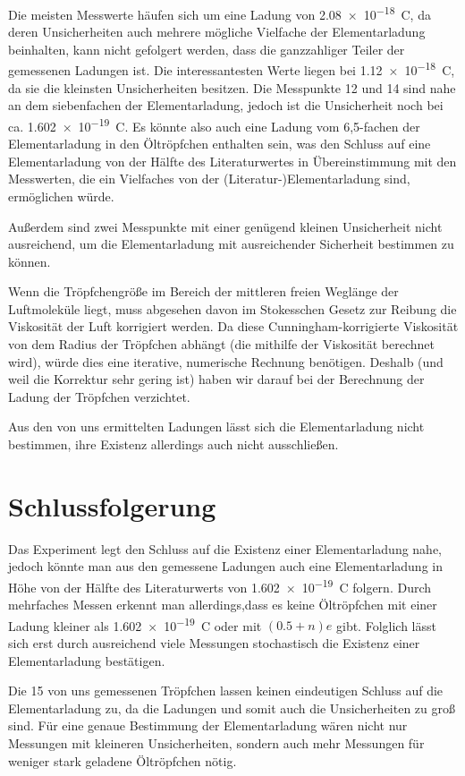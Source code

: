 \documentclass[
	a4paper,
	12pt,
	pagesize,
	ngerman
]{scrartcl}
\begin{document}
	Die meisten Messwerte häufen sich um  eine Ladung von \SI{2,08e-18}{C}, da deren Unsicherheiten auch mehrere mögliche Vielfache der Elementarladung beinhalten, kann nicht gefolgert werden, dass die ganzzahliger Teiler der gemessenen Ladungen ist.
	Die interessantesten Werte liegen bei \SI{1,12e-18}{C}, da sie die kleinsten Unsicherheiten besitzen.
	Die Messpunkte 12 und 14 sind nahe an dem siebenfachen der Elementarladung, jedoch ist die Unsicherheit noch bei ca. \SI{1,602e-19}{C}.
	Es könnte also auch eine Ladung vom 6,5-fachen der Elementarladung in den Öltröpfchen enthalten sein, was den Schluss auf eine Elementarladung von der Hälfte des Literaturwertes in Übereinstimmung mit den Messwerten, die ein Vielfaches von der (Literatur-)Elementarladung sind, ermöglichen würde.
	
	Außerdem sind zwei Messpunkte mit einer genügend kleinen Unsicherheit nicht ausreichend, um die Elementarladung mit ausreichender Sicherheit bestimmen zu können.
	
	Wenn die Tröpfchengröße im Bereich der mittleren freien Weglänge der Luftmoleküle liegt, muss abgesehen davon im Stokesschen Gesetz zur Reibung die Viskosität der Luft korrigiert werden.
	Da diese Cunningham-korrigierte Viskosität von dem Radius der Tröpfchen abhängt (die mithilfe der Viskosität berechnet wird), würde dies eine iterative, numerische Rechnung benötigen.
	Deshalb (und weil die Korrektur sehr gering ist) haben wir darauf bei der Berechnung der Ladung der Tröpfchen verzichtet.

	Aus den von uns ermittelten Ladungen lässt sich die Elementarladung nicht bestimmen, ihre Existenz allerdings auch nicht ausschließen.

	
	\section{Schlussfolgerung}
	Das Experiment legt den Schluss auf die Existenz einer Elementarladung nahe, jedoch könnte man aus den gemessene Ladungen auch eine Elementarladung in Höhe von der Hälfte des Literaturwerts von \SI{1,602e-19}{C} folgern.
	Durch mehrfaches Messen erkennt man allerdings,dass es keine Öltröpfchen mit einer Ladung kleiner als \SI{1,602e-19}{C} oder mit $(0.5+n)e$ gibt. 
	Folglich lässt sich erst durch ausreichend viele Messungen stochastisch die Existenz einer Elementarladung bestätigen.

	Die 15 von uns gemessenen Tröpfchen lassen keinen eindeutigen Schluss auf die Elementarladung zu, da die Ladungen und somit auch die Unsicherheiten zu groß sind.
	Für eine genaue Bestimmung der Elementarladung wären nicht nur Messungen mit kleineren Unsicherheiten, sondern auch mehr Messungen für weniger stark geladene Öltröpfchen nötig.
\end{document}
